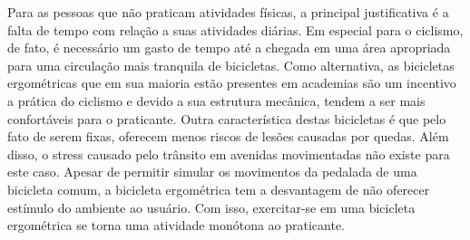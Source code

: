 Para as pessoas que não praticam atividades físicas, a principal justificativa é a falta de tempo com relação a suas atividades diárias. Em especial para o 
ciclismo, de fato, é necessário um gasto de tempo até a chegada em uma área apropriada para uma circulação mais tranquila de bicicletas. Como alternativa, as 
bicicletas ergométricas que em sua maioria estão presentes em academias são um incentivo a prática do ciclismo e devido a sua estrutura mecânica, tendem a ser 
mais confortáveis para o praticante.
Outra característica destas bicicletas é que pelo fato de serem fixas, oferecem menos riscos de lesões causadas por quedas. Além disso, o stress causado pelo 
trânsito em avenidas movimentadas não existe para este caso. Apesar de permitir simular os movimentos da pedalada de uma bicicleta comum, a bicicleta ergométrica 
tem a desvantagem de não oferecer estímulo do ambiente ao usuário. Com isso, exercitar-se em uma bicicleta ergométrica se torna uma atividade monótona ao 
praticante.


